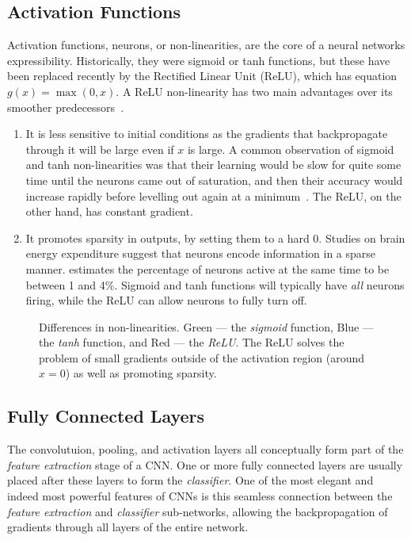 \subsection{Activation Functions}\label{sec:cnn_neurons}
  Activation functions, neurons, or non-linearities, are the core of a neural networks
  expressibility. Historically, they were sigmoid or tanh functions, but these
  have been replaced recently by the Rectified Linear Unit (ReLU), which has
  equation $g(x) = \max(0,x)$. A ReLU
  non-linearity has two main advantages over its smoother predecessors~\citep{%
  glorot_deep_2011, nair_rectified_2010}.
  \begin{enumerate}
  \item It is less sensitive to initial conditions as the gradients that
    backpropagate through it will be large even if $x$ is large. A common
    observation of sigmoid and tanh non-linearities was that their learning would
    be slow for quite some time until the neurons came out of saturation, and then
    their accuracy would increase rapidly before levelling out again at
    a minimum~\citep{glorot_understanding_2010}. The ReLU, on the other hand, has
    constant gradient.
  \item It promotes sparsity in outputs, by setting them to a hard 0. Studies
    on brain energy expenditure suggest that neurons encode information in
    a sparse manner. \citet{lennie_cost_2003} estimates the percentage of
    neurons active at the same time to be between 1 and 4\%. Sigmoid and tanh
    functions will typically have \emph{all} neurons firing, while 
    the ReLU can allow neurons to fully turn off.
  \end{enumerate}

  \begin{figure}
    \centering
      \caption[Differences in non-linearities]
              {Differences in non-linearities. Green --- the \emph{sigmoid} function, 
               Blue --- the \emph{tanh} function, and Red --- the \emph{ReLU}. The ReLU
               solves the problem of small gradients outside of the activation
               region (around $x=0$) as well as promoting sparsity.}\label{fig:nonlinearities}
  \end{figure}

\subsection{Fully Connected Layers}\label{sec:cnn_fullyconnected}
  The convolutuion, pooling, and activation layers all
  conceptually form part of the \emph{feature extraction} stage of a CNN. One
  or more fully connected layers are usually placed after these layers to form
  the \emph{classifier}. One of the most elegant and indeed most powerful
  features of CNNs is this seamless connection between the \emph{feature
  extraction} and \emph{classifier} sub-networks, allowing the backpropagation
  of gradients through all layers of the entire network.

